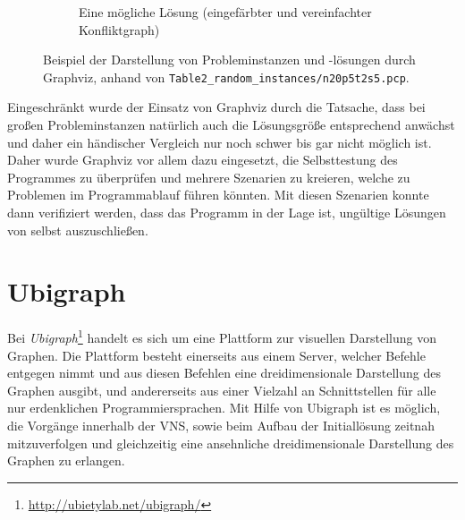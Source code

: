 \begin{figure}
\begin{subfigure}[t]{0.45\textwidth}
		\caption{Eine mögliche Lösung (eingefärbter und vereinfachter Konfliktgraph)}
		\label{fig:graphviz:post}
	\end{subfigure}
	\label{fig:graphviz}
	\caption{Beispiel der Darstellung von Probleminstanzen und -lösungen durch Graphviz, anhand von \texttt{Table2\_random\_instances/n20p5t2s5.pcp}.}
\end{figure}

Eingeschränkt wurde der Einsatz von Graphviz durch die Tatsache, dass bei großen Pro\-blem\-in\-stan\-zen natürlich auch die Lösungsgröße entsprechend anwächst und daher ein hän\-disch\-er Vergleich nur noch schwer bis gar nicht möglich
ist. Daher wurde Graphviz vor allem dazu eingesetzt, die Selbsttestung des Programmes zu überprüfen und mehrere Szenarien zu kreieren, welche zu Problemen im Programmablauf führen könnten. Mit diesen Szenarien
kon\-nte dann verifiziert werden, dass das Programm in der Lage ist, ungültige Lösungen von selbst auszuschließen.


\section{Ubigraph}
\label{sec:ubigraph}
Bei \textit{Ubigraph}\footnote{\url{http://ubietylab.net/ubigraph/}} handelt es sich um eine Plattform zur visuellen Darstellung von Graphen. Die Plattform besteht einerseits aus einem Server, welcher Befehle entgegen nimmt und aus diesen Befehlen eine 
dreidimensionale Darstellung des Graphen ausgibt, und andererseits aus einer Vielzahl an Schnittstellen für alle nur erdenklichen Programmiersprachen. Mit Hilfe von Ubigraph ist es möglich, die
Vorgänge innerhalb der VNS, sowie beim Aufbau der Initiallösung zeitnah mitzuverfolgen und gleichzeitig eine ansehnliche dreidimensionale Darstellung des Graphen zu erlangen.

